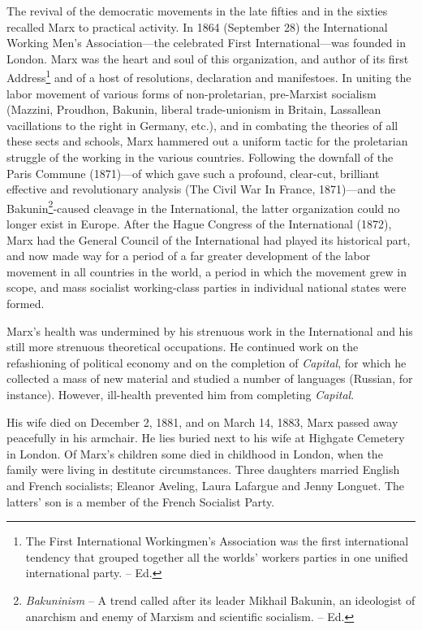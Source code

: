 \documentclass[a4paper,12pt]{book}
\begin{document}
The revival of the democratic movements in the late fifties and in the sixties recalled Marx to practical activity. In 1864 (September 28) the International Working Men’s Association—the celebrated First International—was founded in London. Marx was the heart and soul of this organization, and author of its first Address\footnote{The First International Workingmen’s Association was the first international tendency that grouped together all the worlds’ workers parties in one unified international party. -- Ed.} and of a host of resolutions, declaration and manifestoes. In uniting the labor movement of various forms of non-proletarian, pre-Marxist socialism (Mazzini, Proudhon, Bakunin, liberal trade-unionism in Britain, Lassallean vacillations to the right in Germany, etc.), and in combating the theories of all these sects and schools, Marx hammered out a uniform tactic for the proletarian struggle of the working in the various countries. Following the downfall of the Paris Commune (1871)—of which gave such a profound, clear-cut, brilliant effective and revolutionary analysis (The Civil War In France, 1871)—and the Bakunin\footnote{\emph{Bakuninism} -- A trend called after its leader Mikhail Bakunin, an ideologist of anarchism and enemy of Marxism and scientific socialism. -- Ed. }-caused cleavage in the International, the latter organization could no longer exist in Europe. After the Hague Congress of the International (1872), Marx had the General Council of the International had played its historical part, and now made way for a period of a far greater development of the labor movement in all countries in the world, a period in which the movement grew in scope, and mass socialist working-class parties in individual national states were formed.

Marx’s health was undermined by his strenuous work in the International and his still more strenuous theoretical occupations. He continued work on the refashioning of political economy and on the completion of \emph{Capital}, for which he collected a mass of new material and studied a number of languages (Russian, for instance). However, ill-health prevented him from completing \emph{Capital}.

His wife died on December 2, 1881, and on March 14, 1883, Marx passed away peacefully in his armchair. He lies buried next to his wife at Highgate Cemetery in London. Of Marx’s children some died in childhood in London, when the family were living in destitute circumstances. Three daughters married English and French socialists; Eleanor Aveling, Laura Lafargue and Jenny Longuet. The latters’ son is a member of the French Socialist Party.
\end{document}
